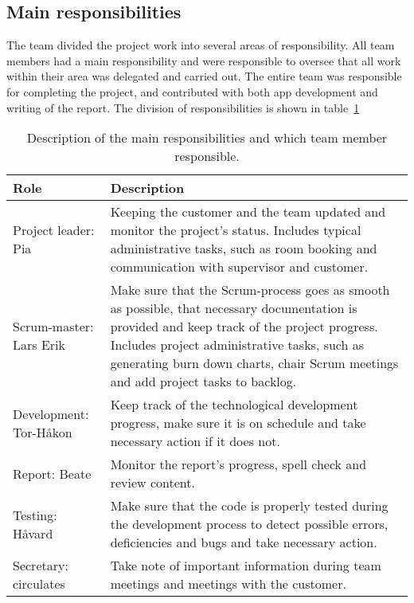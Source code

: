 \newpage
\subsection{Main responsibilities}
\label{sec:mainresp}
The team divided the project work into several areas of responsibility. All team members had a main responsibility and were responsible to oversee that all work within their area was delegated and carried out. The entire team was responsible for completing the project, and contributed with both app development and writing of the report. The division of responsibilities is shown in table~\ref{tab:mainResponsibilities}


\begin{table}[H]
\centering
{}
\begin{tabular}{|l|p{11.2cm}|}
\hline
\textbf{Role} & \textbf{Description}\\\hline
Project leader: Pia & Keeping the customer and the team updated and monitor the project's status. Includes typical administrative tasks, such as room booking and communication with supervisor and customer.\\\hline
Scrum-master: Lars Erik & Make sure that the Scrum-process goes as smooth as possible, that necessary documentation is provided and keep track of the project progress. Includes project administrative tasks, such as generating burn down charts, chair Scrum meetings and add project tasks to backlog.\\\hline
Development: Tor-Håkon & Keep track of the technological development progress, make sure it is on schedule and take necessary action if it does not.\\\hline
Report: Beate & Monitor the report's progress, spell check and review content.\\\hline
Testing: Håvard & Make sure that the code is properly tested during the development process to detect possible errors, deficiencies and bugs and take necessary action. \\\hline
Secretary: circulates & Take note of important information during team meetings and meetings with the customer.\\\hline
\end{tabular}
\caption{Description of the main responsibilities and which team member responsible.}
\label{tab:mainResponsibilities}
\end{table}

